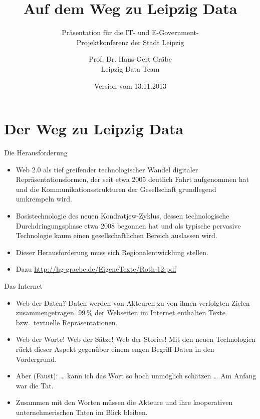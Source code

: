 \documentclass{beamer}
\title{Auf dem Weg zu Leipzig Data}
\subtitle{Präsentation für die IT- und E-Government-\\ Projektkonferenz der
  Stadt Leipzig}
\author[Das Leipzig Data Team]{Prof. Dr. Hans-Gert Gräbe\\ Leipzig Data Team}
\institute[]{Universität Leipzig\\ \url{http://leipzig-data.de}}
\date{Version vom 13.11.2013}
\begin{document}
\begin{frame}
\titlepage
\end{frame}

\section{Der Weg zu Leipzig Data}
\begin{frame}{Die Herausforderung}{}
  \begin{itemize}
  \item Web 2.0 als tief greifender technologischer Wandel digitaler
    Repräsentationsformen, der seit etwa 2005 deutlich Fahrt aufgenommen hat
    und die Kommunikationsstrukturen der Gesellschaft grundlegend umkrempeln
    wird.
  \item Basistechnologie des neuen Kondratjew-Zyklus, dessen technologische
    Durchdringungsphase etwa 2008 begonnen hat und als typische pervasive
    Technologie kaum einen gesellschaftlichen Bereich auslassen wird.
  \item Dieser Herausforderung muss sich Regionalentwicklung stellen.
  \item Dazu \url{http://hg-graebe.de/EigeneTexte/Roth-12.pdf}
  \end{itemize}
\end{frame}

\begin{frame}{Das Internet}{}
  \begin{itemize}
  \item Web der Daten? Daten werden von {Akteuren} zu von ihnen verfolgten
    {Zielen} zusammengetragen. 99\,\% der Webseiten im Internet enthalten
    {Texte} bzw.\ {textuelle Repräsentationen}.
  \item Web der Worte! Web der Sätze! Web der Stories! Mit den neuen
    Technologien rückt {dieser} Aspekt gegenüber einem engen Begriff
    {Daten} in den Vordergrund.
  \item Aber (Faust): {\ldots} kann ich das {Wort} so hoch unmöglich
    schätzen {\ldots} Am Anfang war die {Tat}.
  \item Zusammen mit den {Worten} müssen die {Akteure} und ihre
    {kooperativen unternehmerischen Taten} im Blick bleiben.
  \end{itemize}
\end{frame}
\end{document}
